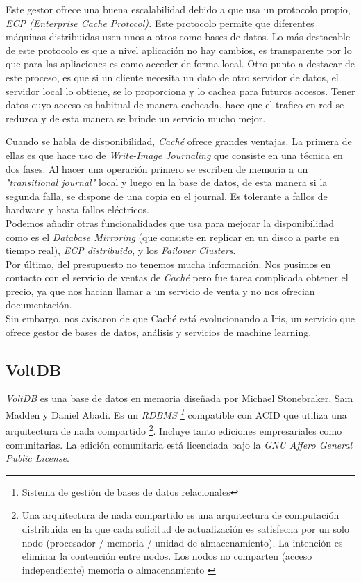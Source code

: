 \documentclass[3pt]{article}
\begin{document}
Este gestor ofrece una buena escalabilidad debido a que usa un protocolo propio, \emph{ECP (Enterprise Cache Protocol).} Este protocolo permite que diferentes máquinas distribuidas usen unos a otros como bases de datos. Lo más destacable de este protocolo es que a nivel aplicación no hay cambios, es transparente por lo que para las apliaciones es como acceder de forma local. Otro punto a destacar de este proceso, es que si un cliente necesita un dato de otro servidor de datos, el servidor local lo obtiene, se lo proporciona y lo cachea para futuros accesos. Tener datos cuyo acceso es habitual de manera cacheada, hace que el trafico en red se reduzca y de esta manera se brinde un servicio mucho mejor.

Cuando  se habla de disponibilidad, \emph{Caché} ofrece grandes ventajas. La primera de ellas es que hace uso de \emph{Write-Image Journaling} que consiste en una técnica en dos fases. Al hacer una operación primero se escriben de memoria a un \emph{"transitional journal"} local  y luego en la base de datos, de esta manera si la segunda falla, se dispone de una copia en el journal. Es tolerante a fallos de hardware y hasta fallos eléctricos. \\
Podemos añadir otras funcionalidades que usa para mejorar la disponibilidad como es el \emph{Database Mirroring} (que consiste en replicar en un disco a parte en tiempo real), \emph{ECP distribuido}, y los \emph{Failover Clusters}. \cite{CACHE:2}\\

Por último, del presupuesto no tenemos mucha información. Nos pusimos en contacto con el servicio de ventas de \emph{Caché} pero fue tarea complicada obtener el precio, ya que nos hacian llamar a un servicio de venta y no nos ofrecian documentación.\\ Sin embargo, nos avisaron de que Caché está evolucionando a Iris, un servicio que ofrece gestor de bases de datos, análisis y servicios de machine learning.\\

\subsection{VoltDB}
\emph{VoltDB} es una base de datos en memoria diseñada por Michael Stonebraker, Sam Madden y Daniel Abadi. Es un \emph{RDBMS \footnote{Sistema de gestión de bases de datos relacionales }} compatible con ACID que utiliza una arquitectura de nada compartido \footnote{Una arquitectura de nada compartido es una arquitectura de computación distribuida en la que cada solicitud de actualización es satisfecha por un solo nodo (procesador / memoria / unidad de almacenamiento). La intención es eliminar la contención entre nodos. Los nodos no comparten (acceso independiente) memoria o almacenamiento \cite{VOLT:1}}. Incluye tanto ediciones empresariales como comunitarias. La edición comunitaria está licenciada bajo la \emph{GNU Affero General Public License}. \cite{VOLT:2}\\
\end{document}
